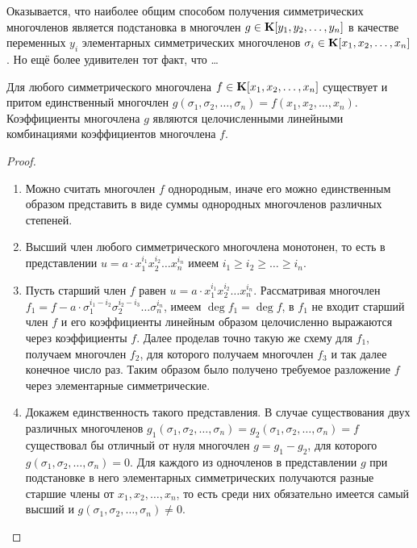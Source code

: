 Оказывается, что наиболее общим способом получения симметрических многочленов является подстановка в многочлен $g\in\mathbf{K}[y_1,y_2,\dots,y_n]$ в качестве переменных $y_i$ элементарных симметрических многочленов $\sigma_i\in\mathbf{K}[x_1,x_2,\dots,x_n]$. Но ещё более удивителен тот факт, что \dots

\begin{theorem}
  Для любого симметрического многочлена $f\in\mathbf{K}[x_1,x_2,\dots,x_n]$ существует и притом единственный многочлен $g(\sigma_1,\sigma_2,\dots,\sigma_n)=f(x_1,x_2,\dots,x_n)$. Коэффициенты многочлена $g$ являются целочисленными линейными комбинациями коэффициентов многочлена $f$.
\end{theorem}
\begin{proof}\par\strut\\
  \begin{enumerate}
    \item Можно считать многочлен $f$ однородным, иначе его можно единственным образом представить в виде суммы однородных многочленов различных степеней.
    \item Высший член любого симметрического многочлена монотонен, то есть в представлении $u=a\cdot x_1^{i_1}x_2^{i_2}\dots x_n^{i_n}$ имеем $i_1\ge i_2\ge\dots\ge i_n$.
    \item Пусть старший член $f$ равен $u=a\cdot x_1^{i_1}x_2^{i_2}\dots x_n^{i_n}$. Рассматривая многочлен $f_1=f - a\cdot\sigma_1^{i_1-i_2}\sigma_2^{i_2-i_3}\dots\sigma_n^{i_n}$, имеем $\deg f_1 = \deg f$, в $f_1$ не входит старший член $f$ и его коэффициенты линейным образом целочисленно выражаются через коэффициенты $f$. Далее проделав точно такую же схему для $f_1$, получаем многочлен $f_2$, для которого получаем многочлен $f_3$ и так далее конечное число раз. Таким образом было получено требуемое разложение $f$ через элементарные симметрические.
    \item Докажем единственность такого представления. В случае существования двух различных многочленов $g_1(\sigma_1, \sigma_2, \dots,\sigma_n)=g_2(\sigma_1, \sigma_2, \dots,\sigma_n)=f$ существовал бы отличный от нуля многочлен $g=g_1-g_2$, для которого $g(\sigma_1,\sigma_2,\dots,\sigma_n)=0$. Для каждого из одночленов в представлении $g$ при подстановке в него элементарных симметрических получаются разные старшие члены от $x_1,x_2,\dots,x_n$, то есть среди них обязательно имеется самый высший и $g(\sigma_1,\sigma_2,\dots,\sigma_n)\ne0$.
  \end{enumerate}
\end{proof}

